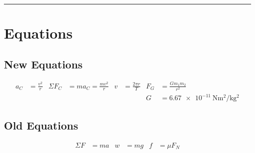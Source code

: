 \documentclass[10pt]{exam}
\begin{document}
\vspace{1em}
\hrule
\vspace{1em}


\section*{Equations}
\subsection*{New Equations}

\begin{align*}
  a_C        &= \frac{v^2}{r} &
  \Sigma F_C &= ma_C = \frac{mv^2}{r}  &
  v          &= \frac{2\pi r}{T} &
  F_G        &= \frac{Gm_1 m_2}{r^2} \\
  &&&&&& G   &= \SI{6.67e-11}
                {\newton\meter^2\per\kilo\gram^2}
\end{align*}


\subsection*{Old Equations}

\begin{align*}
  \Sigma F &= ma &
  w      &= mg &
  f      &= \mu F_N
\end{align*}
\end{document}
